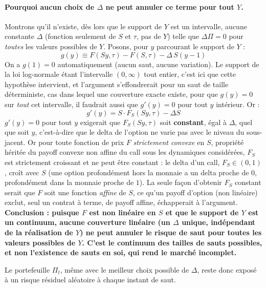 \documentclass{article}
\begin{document}
\paragraph{Pourquoi aucun choix de $\Delta$ ne peut annuler ce terme pour tout $Y$.} Montrons qu'il n'existe, dès lors que le support de $Y$ est un intervalle, aucune constante $\Delta$ (fonction seulement de $S$ et $\tau$, pas de $Y$) telle que $\Delta\Pi = 0$ pour \emph{toutes} les valeurs possibles de $Y$. Posons, pour $y$ parcourant le support de $Y$ :
\begin{equation}
g(y) \equiv F(Sy,\tau) - F(S,\tau) - \Delta\, S(y-1)
\end{equation}
On a $g(1) = 0$ automatiquement (aucun saut, aucune variation). Le support de la loi log-normale étant l'intervalle $(0,\infty)$ tout entier, c'est ici que cette hypothèse intervient, et l'argument s'effondrerait pour un saut de taille déterministe, cas dans lequel une couverture exacte existe, pour que $g(y)=0$ sur \emph{tout} cet intervalle, il faudrait aussi que $g'(y)=0$ pour tout $y$ intérieur. Or :
\begin{equation}
g'(y) = S \cdot F_S(Sy,\tau) - \Delta S
\end{equation}
$g'(y)=0$ pour tout $y$ exigerait que $F_S(Sy,\tau)$ soit \textbf{constant}, égal à $\Delta$, quel que soit $y$, c'est-à-dire que le delta de l'option ne varie pas avec le niveau du sous-jacent. Or pour toute fonction de prix $F$ \emph{strictement convexe} en $S$, propriété héritée du payoff convexe non affine du call sous les dynamiques considérées, $F_S$ est strictement croissant et ne peut être constant : le delta d'un call, $F_S \in (0,1)$, croît avec $S$ (une option profondément hors la monnaie a un delta proche de $0$, profondément dans la monnaie proche de $1$). La seule façon d'obtenir $F_S$ constant serait que $F$ soit une fonction \emph{affine} de $S$, ce qu'un payoff d'option (non linéaire) exclut, seul un contrat à terme, de payoff affine, échapperait à l'argument.\\
\textbf{Conclusion : puisque $F$ est non linéaire en $S$ et que le support de $Y$ est un continuum, aucune couverture linéaire (un $\Delta$ unique, indépendant de la réalisation de $Y$) ne peut annuler le risque de saut pour toutes les valeurs possibles de $Y$. C'est le continuum des tailles de sauts possibles, et non l'existence de sauts en soi, qui rend le marché incomplet.}

Le portefeuille $\Pi_t$, même avec le meilleur choix possible de $\Delta$, reste donc exposé à un risque résiduel aléatoire à chaque instant de saut.
\end{document}
